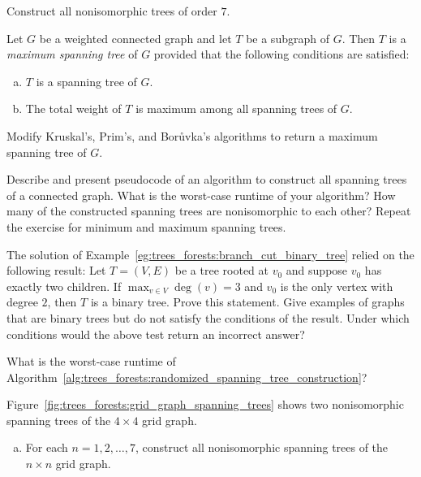 \begin{problem}
\item Construct all nonisomorphic trees of order $7$.

\item Let $G$ be a weighted connected graph and let $T$ be a subgraph
  of $G$. Then $T$ is a
  \emph{maximum spanning tree} of $G$
  provided that the following conditions are satisfied:
  \begin{enumerate}[(a)]
  \item $T$ is a spanning tree of $G$.

  \item The total weight of $T$ is maximum among all spanning trees of
    $G$.
  \end{enumerate}
  Modify Kruskal's,
  Prim's, and
  Bor\r{u}vka's algorithms to return a
  maximum spanning tree of $G$.

\item Describe and present pseudocode of an algorithm to construct all
  spanning trees of a connected graph. What is the worst-case runtime
  of your algorithm? How many of the constructed spanning trees are
  nonisomorphic to each other? Repeat the exercise for minimum and
  maximum spanning trees.

\item\label{prob:trees_forests:binary_tree_test} The solution of
  Example~\ref{eg:trees_forests:branch_cut_binary_tree} relied on the
  following result: Let $T = (V,E)$ be a tree rooted at $v_0$ and
  suppose $v_0$ has exactly two children. If
  $\max_{v \in V} \deg(v) = 3$ and $v_0$ is the only vertex with
  degree $2$, then $T$ is a binary tree. Prove this statement. Give
  examples of graphs that are binary trees but do not satisfy the
  conditions of the result. Under which conditions would the above
  test return an incorrect answer?

\item What is the worst-case runtime of
  Algorithm~\ref{alg:trees_forests:randomized_spanning_tree_construction}?

\item Figure~\ref{fig:trees_forests:grid_graph_spanning_trees} shows
  two nonisomorphic spanning trees of the $4 \times 4$ grid graph.
  \begin{enumerate}[(a)]
  \item For each $n = 1, 2, \dots, 7$, construct all nonisomorphic
    spanning trees of the $n \times n$ grid graph.


\end{enumerate}
\end{problem}
